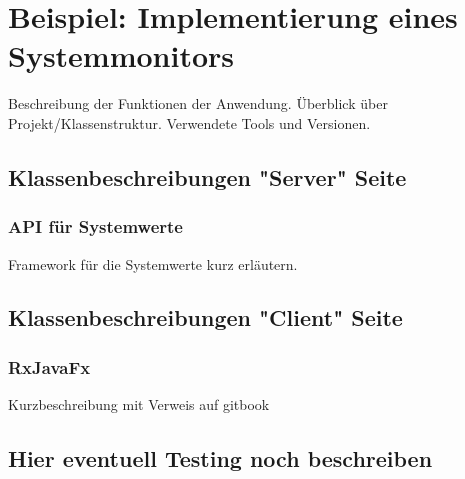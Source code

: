 \chapter{Beispiel: Implementierung eines Systemmonitors}\label{beispiel}
Beschreibung der Funktionen der Anwendung. Überblick über Projekt/Klassenstruktur. Verwendete Tools und Versionen. 

\section{Klassenbeschreibungen "Server" Seite}
\subsection{API für Systemwerte}
Framework für die Systemwerte kurz erläutern. 

\section{Klassenbeschreibungen "Client" Seite}
\subsection{RxJavaFx}
Kurzbeschreibung mit Verweis auf gitbook

\section{Hier eventuell Testing noch beschreiben}
